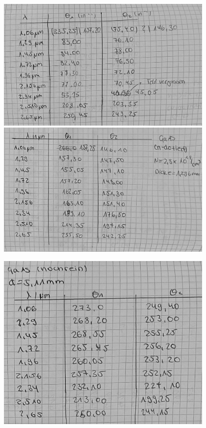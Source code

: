 \vfill
\includegraphics[width=0.8\textwidth]{content/messung/2.jpg}
\vfill
\includegraphics[width=0.8\textwidth]{content/messung/3.jpg}
\vfill
\newpage

\vfill
\includegraphics[width=0.8\textwidth]{content/messung/4.jpg}
\vfill
\newpage

